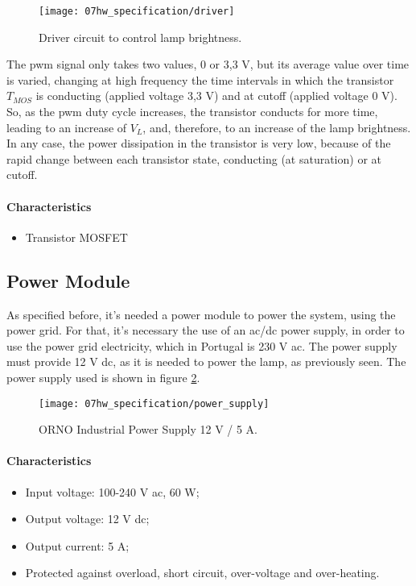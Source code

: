 \begin{figure}[H]
	\centering
	\texttt{[image: 07hw\_specification/driver]}
	\caption{Driver circuit to control lamp brightness.}
	\label{fig:driver}
\end{figure}

The \ac{pwm} signal only takes two values, 0 or 3,3 V, but its average value over time is varied, changing at high frequency the time intervals in which the transistor \(T_{MOS}\) is conducting (applied voltage 3,3 V) and at cutoff (applied voltage 0 V). So, as the \ac{pwm} duty cycle increases, the transistor conducts for more time, leading to an increase of \(V_{L}\), and, therefore, to an increase of the lamp brightness. In any case, the power dissipation in the transistor is very low, because of the rapid change between each transistor state, conducting (at saturation) or at cutoff.

\paragraph*{Characteristics}
\begin{itemize}
	\item Transistor MOSFET
\end{itemize}



\subsection{Power Module}
As specified before, it's needed a power module to power the system, using the power grid. For that, it's necessary the use of an \ac{ac}/\ac{dc} power supply, in order to use the power grid electricity, which in Portugal is 230 V \ac{ac}. The power supply must provide 12 V \ac{dc}, as it is needed to power the lamp, as previously seen. The power supply used is shown in figure \ref{fig:power_supply}. \cite{power_supply}

\begin{figure}[H]
	\centering
	\texttt{[image: 07hw\_specification/power\_supply]}
	\caption{ORNO Industrial Power Supply 12 V / 5 A.}
	\label{fig:power_supply}
\end{figure}

\paragraph*{Characteristics}
\begin{itemize}
	\item Input voltage: 100-240 V \ac{ac}, 60 W;
	\item Output voltage: 12 V \ac{dc};
	\item Output current: 5 A;
	\item Protected against overload, short circuit, over-voltage and over-heating.
\end{itemize}

